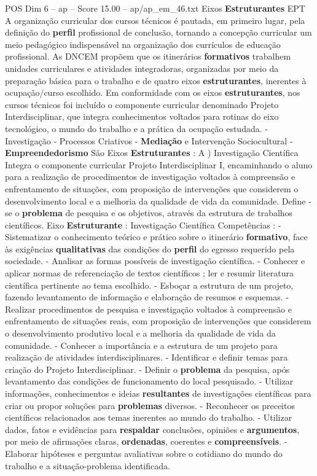 \begin{textsample}{POS Dim 6 – ap – Score 15.00 – ap/ap\_em\_46.txt}  \label{ex:f6_pos_101}
Eixos \textbf{Estruturantes} EPT A organização curricular dos cursos técnicos é pautada, em primeiro lugar, pela definição do \textbf{perfil} profissional de conclusão, tornando a concepção curricular um meio pedagógico indispensável na organização dos currículos de educação profissional.
As DNCEM propõem que os itinerários \textbf{formativos} trabalhem unidades curriculares e atividades integradoras, organizadas por meio da preparação básica para o trabalho e de quatro eixos \textbf{estruturantes}, inerentes à ocupação/curso escolhido.
Em conformidade com os eixos \textbf{estruturantes}, nos cursos técnicos foi incluído o componente curricular denominado Projeto Interdisciplinar, que integra conhecimentos voltados para rotinas do eixo tecnológico, o mundo do trabalho e a prática da ocupação estudada. - Investigação - Processos Criativos - \textbf{Mediação} e Intervenção Sociocultural - \textbf{Empreendedorismo} São Eixos \textbf{Estruturantes} : A ) Investigação Científica Integra o componente curricular Projeto Interdisciplinar I, encaminhando o aluno para a realização de procedimentos de investigação voltados à compreensão e enfrentamento de situações, com proposição de intervenções que considerem o desenvolvimento local e a melhoria da qualidade de vida da comunidade.
Define -se o \textbf{problema} de pesquisa e os objetivos, através da estrutura de trabalhos científicos.
Eixo \textbf{Estruturante} : Investigação Científica Competências : - Sistematizar o conhecimento teórico e prático sobre o itinerário \textbf{formativo}, face às exigências \textbf{qualitativas} das condições do \textbf{perfil} do egresso requerido pela sociedade. - Analisar as formas possíveis de investigação científica. - Conhecer e aplicar normas de referenciação de textos científicos ; ler e resumir literatura científica pertinente ao tema escolhido. - Esboçar a estrutura de um projeto, fazendo levantamento de informação e elaboração de resumos e esquemas. - Realizar procedimentos de pesquisa e investigação voltados à compreensão e enfrentamento de situações reais, com proposição de intervenções que considerem o desenvolvimento produtivo local e a melhoria da qualidade de vida da comunidade. - Conhecer a importância e a estrutura de um projeto para realização de atividades interdisciplinares. - Identificar e definir temas para criação do Projeto Interdisciplinar. - Definir o \textbf{problema} da pesquisa, após levantamento das condições de funcionamento do local pesquisado. - Utilizar informações, conhecimentos e ideias \textbf{resultantes} de investigações científicas para criar ou propor soluções para \textbf{problemas} diversos. - Reconhecer os preceitos científicos relacionados aos temas inerentes ao mundo do trabalho. - Utilizar dados, fatos e evidências para \textbf{respaldar} conclusões, opiniões e \textbf{argumentos}, por meio de afirmações claras, \textbf{ordenadas}, coerentes e \textbf{compreensíveis}. - Elaborar hipóteses e perguntas avaliativas sobre o cotidiano do mundo do trabalho e a situação-problema identificada.

\end{textsample}
